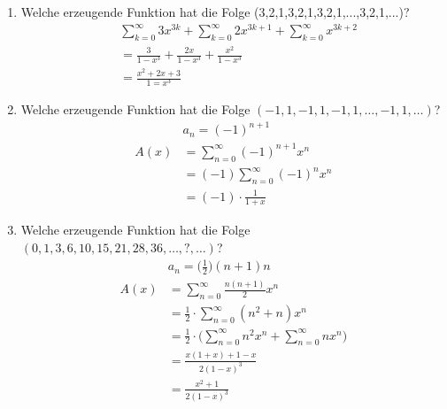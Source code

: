 \begin{enumerate}[label=(\alph*)]
        \item Welche erzeugende Funktion hat die Folge (3,2,1,3,2,1,3,2,1,...,3,2,1,...)? \\
        \begin{align*}
            &\sum_{k=0}^{\infty} 3x^{3k}+\sum_{k=0}^{\infty} 2x^{3k+1}+\sum_{k=0}^{\infty} x^{3k+2} \\
            &= \frac{3}{1-x^3} + \frac{2x}{1-x^3} +\frac{x^2}{1-x^3} \\
            &=\frac{x^2+2x+3}{1=x^3}
        \end{align*}

        \item Welche erzeugende Funktion hat die Folge $(-1, 1, -1, 1, -1, 1,\ldots, -1, 1,\ldots)$?
        \begin{align*}
            &a_n = (-1)^{n+1} \\
            A(x)&=\sum_{n=0}^{\infty} (-1)^{n+1} x^n \\
            &=(-1)\sum_{n=0}^{\infty} (-1)^n x^n \\
            &=(-1)\cdot \frac{1}{1+x}
        \end{align*}

        \item Welche erzeugende Funktion hat die Folge $(0,1,3,6,10,15,21,28,36,\ldots,?,\ldots)$?
        \begin{align*}
            &a_n = \Big(\frac{1}{2}\Big)(n+1)n  \\
            A(x)&=\sum_{n=0}^{\infty} \frac{n(n+1)}{2} x^n \\
            &=\frac{1}{2}\cdot\sum_{n=0}^{\infty} (n^2+n) x^n \\
            &=\frac{1}{2}\cdot\Big(\sum_{n=0}^{\infty} n^2 x^n  + \sum_{n=0}^{\infty} n x^n\Big)\\
            &=\frac{x(1+x) + 1 -x }{2(1-x)^3} \\
            &=\frac{x^2 + 1}{2(1-x)^3}
        \end{align*}


\end{enumerate}
